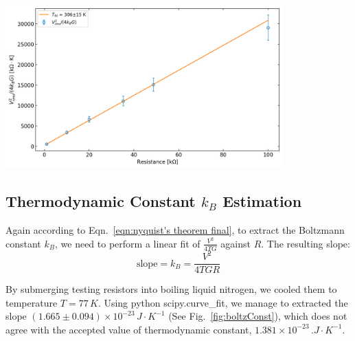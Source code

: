 \documentclass[12pt]{article}
\begin{document}
\begin{center}
    \includegraphics[width=0.8\textwidth]{images/room_fit.png}
    \label{fig:roomTemp}
\end{center}


\subsection{Thermodynamic Constant $k_B$ Estimation}
\quad Again according to Eqn.~\ref{eqn:nyquist's theorem final}, to extract the Boltzmann constant $k_B$, we need to perform a linear fit of $\frac{V^2}{4TG}$ against $R$. The resulting slope:
\begin{equation}
    \text{slope} = k_B = \frac{V^2}{4TGR} \label{eqn:nitro_boil}
\end{equation}

By submerging testing resistors into boiling liquid nitrogen, we cooled them to temperature $T = 77\,\si{K}$. 
Using python scipy.curve\_fit, we manage to extracted the slope $(1.665\pm 0.094)\times 10^{-23}\, \si{J\cdot K^{-1}}$  (See Fig.~\ref{fig:boltzConst}), which does not agree with the accepted value of thermodynamic constant, $1.381\times 10^{-23}\,\si{.J \cdot K^{-1}}$.
\end{document}
